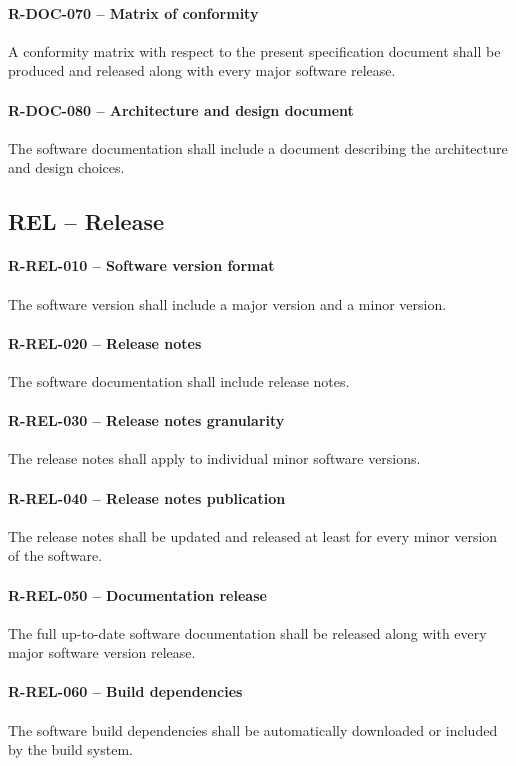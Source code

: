 \paragraph{R-DOC-070 -- Matrix of conformity}
A conformity matrix with respect to the present specification document shall
be produced and released along with every major software release.

\paragraph{R-DOC-080 -- Architecture and design document}
The software documentation shall include a document describing the architecture
and design choices.

\subsection{REL -- Release}
\paragraph{R-REL-010 -- Software version format}
The software version shall include a major version and a minor version.

\paragraph{R-REL-020 -- Release notes}
The software documentation shall include release notes.

\paragraph{R-REL-030 -- Release notes granularity}
The release notes shall apply to individual minor software versions.

\paragraph{R-REL-040 -- Release notes publication}
The release notes shall be updated and released at least for every minor
version of the software.

\paragraph{R-REL-050 -- Documentation release}
The full up-to-date software documentation shall be released along with
every major software version release.

\paragraph{R-REL-060 -- Build dependencies}
The software build dependencies shall be automatically downloaded or included by
the build system.

